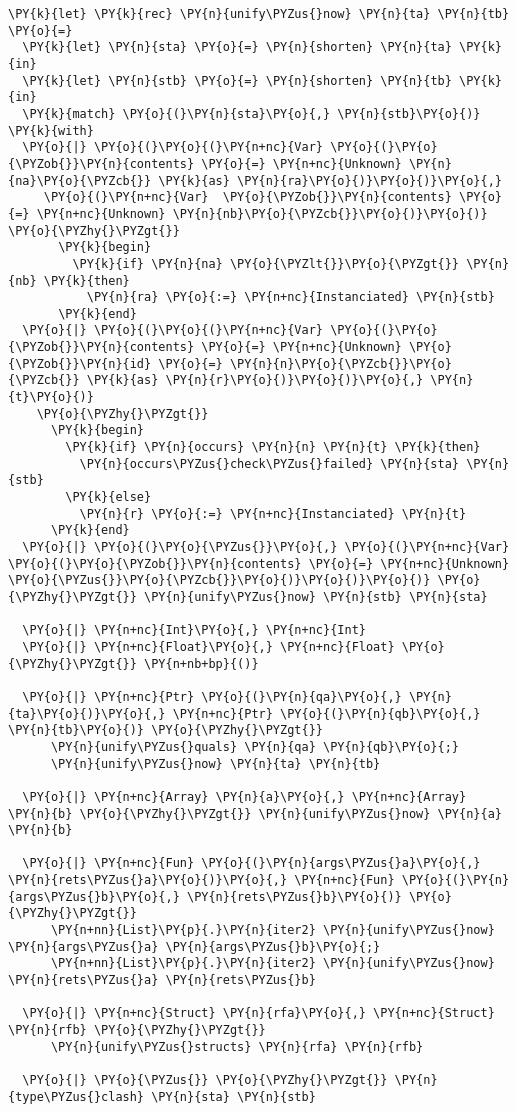 \begin{Verbatim}[commandchars=\\\{\}]
\PY{k}{let} \PY{k}{rec} \PY{n}{unify\PYZus{}now} \PY{n}{ta} \PY{n}{tb} \PY{o}{=}
  \PY{k}{let} \PY{n}{sta} \PY{o}{=} \PY{n}{shorten} \PY{n}{ta} \PY{k}{in}
  \PY{k}{let} \PY{n}{stb} \PY{o}{=} \PY{n}{shorten} \PY{n}{tb} \PY{k}{in}
  \PY{k}{match} \PY{o}{(}\PY{n}{sta}\PY{o}{,} \PY{n}{stb}\PY{o}{)} \PY{k}{with}
  \PY{o}{|} \PY{o}{(}\PY{o}{(}\PY{n+nc}{Var} \PY{o}{(}\PY{o}{\PYZob{}}\PY{n}{contents} \PY{o}{=} \PY{n+nc}{Unknown} \PY{n}{na}\PY{o}{\PYZcb{}} \PY{k}{as} \PY{n}{ra}\PY{o}{)}\PY{o}{)}\PY{o}{,}
     \PY{o}{(}\PY{n+nc}{Var}  \PY{o}{\PYZob{}}\PY{n}{contents} \PY{o}{=} \PY{n+nc}{Unknown} \PY{n}{nb}\PY{o}{\PYZcb{}}\PY{o}{)}\PY{o}{)} \PY{o}{\PYZhy{}\PYZgt{}}
       \PY{k}{begin}
         \PY{k}{if} \PY{n}{na} \PY{o}{\PYZlt{}}\PY{o}{\PYZgt{}} \PY{n}{nb} \PY{k}{then}
           \PY{n}{ra} \PY{o}{:=} \PY{n+nc}{Instanciated} \PY{n}{stb}
       \PY{k}{end}
  \PY{o}{|} \PY{o}{(}\PY{o}{(}\PY{n+nc}{Var} \PY{o}{(}\PY{o}{\PYZob{}}\PY{n}{contents} \PY{o}{=} \PY{n+nc}{Unknown} \PY{o}{\PYZob{}}\PY{n}{id} \PY{o}{=} \PY{n}{n}\PY{o}{\PYZcb{}}\PY{o}{\PYZcb{}} \PY{k}{as} \PY{n}{r}\PY{o}{)}\PY{o}{)}\PY{o}{,} \PY{n}{t}\PY{o}{)}
    \PY{o}{\PYZhy{}\PYZgt{}}
      \PY{k}{begin}
        \PY{k}{if} \PY{n}{occurs} \PY{n}{n} \PY{n}{t} \PY{k}{then}
          \PY{n}{occurs\PYZus{}check\PYZus{}failed} \PY{n}{sta} \PY{n}{stb}
        \PY{k}{else}
          \PY{n}{r} \PY{o}{:=} \PY{n+nc}{Instanciated} \PY{n}{t}
      \PY{k}{end}
  \PY{o}{|} \PY{o}{(}\PY{o}{\PYZus{}}\PY{o}{,} \PY{o}{(}\PY{n+nc}{Var} \PY{o}{(}\PY{o}{\PYZob{}}\PY{n}{contents} \PY{o}{=} \PY{n+nc}{Unknown} \PY{o}{\PYZus{}}\PY{o}{\PYZcb{}}\PY{o}{)}\PY{o}{)}\PY{o}{)} \PY{o}{\PYZhy{}\PYZgt{}} \PY{n}{unify\PYZus{}now} \PY{n}{stb} \PY{n}{sta}

  \PY{o}{|} \PY{n+nc}{Int}\PY{o}{,} \PY{n+nc}{Int}
  \PY{o}{|} \PY{n+nc}{Float}\PY{o}{,} \PY{n+nc}{Float} \PY{o}{\PYZhy{}\PYZgt{}} \PY{n+nb+bp}{()}

  \PY{o}{|} \PY{n+nc}{Ptr} \PY{o}{(}\PY{n}{qa}\PY{o}{,} \PY{n}{ta}\PY{o}{)}\PY{o}{,} \PY{n+nc}{Ptr} \PY{o}{(}\PY{n}{qb}\PY{o}{,} \PY{n}{tb}\PY{o}{)} \PY{o}{\PYZhy{}\PYZgt{}}
      \PY{n}{unify\PYZus{}quals} \PY{n}{qa} \PY{n}{qb}\PY{o}{;}
      \PY{n}{unify\PYZus{}now} \PY{n}{ta} \PY{n}{tb}

  \PY{o}{|} \PY{n+nc}{Array} \PY{n}{a}\PY{o}{,} \PY{n+nc}{Array} \PY{n}{b} \PY{o}{\PYZhy{}\PYZgt{}} \PY{n}{unify\PYZus{}now} \PY{n}{a} \PY{n}{b}

  \PY{o}{|} \PY{n+nc}{Fun} \PY{o}{(}\PY{n}{args\PYZus{}a}\PY{o}{,} \PY{n}{rets\PYZus{}a}\PY{o}{)}\PY{o}{,} \PY{n+nc}{Fun} \PY{o}{(}\PY{n}{args\PYZus{}b}\PY{o}{,} \PY{n}{rets\PYZus{}b}\PY{o}{)} \PY{o}{\PYZhy{}\PYZgt{}}
      \PY{n+nn}{List}\PY{p}{.}\PY{n}{iter2} \PY{n}{unify\PYZus{}now} \PY{n}{args\PYZus{}a} \PY{n}{args\PYZus{}b}\PY{o}{;}
      \PY{n+nn}{List}\PY{p}{.}\PY{n}{iter2} \PY{n}{unify\PYZus{}now} \PY{n}{rets\PYZus{}a} \PY{n}{rets\PYZus{}b}

  \PY{o}{|} \PY{n+nc}{Struct} \PY{n}{rfa}\PY{o}{,} \PY{n+nc}{Struct} \PY{n}{rfb} \PY{o}{\PYZhy{}\PYZgt{}}
      \PY{n}{unify\PYZus{}structs} \PY{n}{rfa} \PY{n}{rfb}

  \PY{o}{|} \PY{o}{\PYZus{}} \PY{o}{\PYZhy{}\PYZgt{}} \PY{n}{type\PYZus{}clash} \PY{n}{sta} \PY{n}{stb}
\end{Verbatim}
